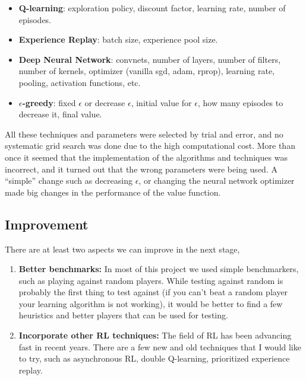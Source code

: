 \documentclass[a4paper]{article}
\begin{document}
\begin{itemize}

    \item \textbf{Q-learning}: exploration policy, discount factor, learning rate, number of episodes.

    \item \textbf{Experience Replay}: batch size, experience pool size.

    \item \textbf{Deep Neural Network}: convnets, number of layers, number of filters, number of kernels, optimizer (vanilla sgd, adam, rprop), learning rate, pooling, activation functions, etc.

    \item \textbf{$\epsilon$-greedy}: fixed $\epsilon$ or decrease $\epsilon$, initial value for $\epsilon$, how many episodes to decrease it, final value.

\end{itemize}

All these techniques and parameters were selected by trial and error, and no systematic grid search was done due to the high computational cost. More than once it seemed that the implementation of the algorithms and techniques was incorrect, and it turned out that the wrong parameters were being used. A ``simple'' change such as decreasing $\epsilon$, or changing the neural network optimizer made big changes in the performance of the value function.

\subsection{Improvement}
There are at least two aspects we can improve in the next stage,

\begin{enumerate}

    \item \textbf{Better benchmarks:} In most of this project we used simple benchmarkers, such as playing against random players. While testing against random is probably the first thing to test against (if you can't beat a random player your learning algorithm is not working), it would be better to find a few heuristics and better players that can be used for testing.

    \item \textbf{Incorporate other RL techniques:} The field of RL has been advancing fast in recent years. There are a few new and old techniques that I would like to try, such as asynchronous RL, double Q-learning, prioritized experience replay.

\end{enumerate}
\end{document}
